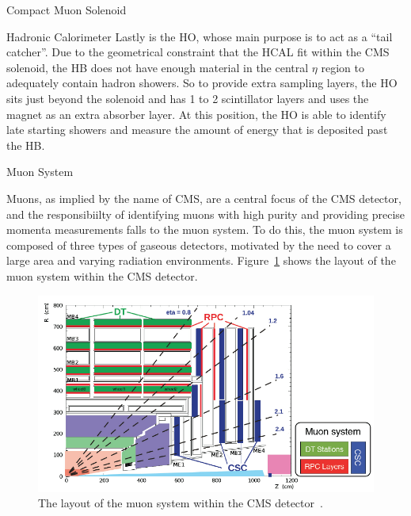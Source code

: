 \begin{section}{Compact Muon Solenoid}
\begin{subsection}{Hadronic Calorimeter}
Lastly is the HO, whose main purpose is to act as a ``tail catcher''. 
Due to the geometrical constraint that the HCAL fit within the CMS solenoid, the HB does not have enough material in the central $\eta$ region to adequately contain hadron showers.
So to provide extra sampling layers, the HO sits just beyond the solenoid and has 1 to 2 scintillator layers and uses the magnet as an extra absorber layer. 
At this position, the HO is able to identify late starting showers and measure the amount of energy that is deposited past the HB.

\end{subsection}

\begin{subsection}{Muon System}

Muons, as implied by the name of CMS, are a central focus of the CMS detector, and the responsibiilty of identifying muons with high purity and providing precise momenta measurements falls to the muon system.
To do this, the muon system is composed of three types of gaseous detectors, motivated by the need to cover a large area and varying radiation environments.
Figure~\ref{fig:cms_muonsys} shows the layout of the muon system within the CMS detector.

\begin{figure}[tbp!]
\begin{center}
\includegraphics[angle=0,width=0.80\columnwidth]{fig/cms_muonsys.png}
\end{center}
\caption{The layout of the muon system within the CMS detector~\cite{1748-0221-8-04-P04005}.}
\label{fig:cms_muonsys}
\end{figure}


\end{subsection}
\end{section}
